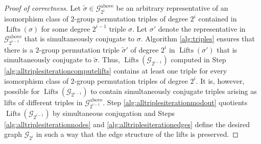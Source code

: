 \documentclass{dcthesis}
\newcommand{\wt}[1]{\widetilde{#1}}
\DeclareMathOperator{\Lifts}{Lifts}
\numberwithin{equation}{section}
\theoremstyle{definition}
\newtheorem{alg}[equation]{Algorithm}
\theoremstyle{remark}
\begin{document}
{{{\begin{proof}[Proof of correctness]
      Let
      $\wt{\sigma}\in\mathscr{G}_{2^i}^\text{above}$
      be an arbitrary representative
      of an isomorphism class of
      $2$-group permutation triples of degree $2^i$
      contained in $\Lifts(\sigma)$
      for some degree $2^{i-1}$ triple $\sigma$.
      Let $\sigma'$ denote the representative
      in $\mathscr{G}_{2^{i-1}}^\text{above}$
      that is simultaneously conjugate to
      $\sigma$.
      Algorithm \ref{alg:triples}
      ensures that there is a
      $2$-group permutation triple $\wt{\sigma}'$
      of degree $2^i$ in
      $\Lifts(\sigma')$
      that is simultaneously conjugate
      to $\wt{\sigma}$.
      Thus,
      $\Lifts(\mathscr{G}_{2^{i-1}})$
      computed in Step
      \ref{alg:alltriplesiterationcomputelifts}
      contains at least one 
      triple for every
      isomorphism class of $2$-group
      permutation triples of degree $2^i$.
      It is,
      however,
      possible for
      $\Lifts(\mathscr{G}_{2^{i-1}})$
      to contain simultaneously conjugate
      triples arising as lifts of
      different triples in
      $\mathscr{G}_{2^{i-1}}^\text{above}$.
      Step
      \ref{alg:alltriplesiterationmodout}
      quotients
      $\Lifts(\mathscr{G}_{2^{i-1}})$
      by simultaneous conjugation
      and
      Steps
      \ref{alg:alltriplesiterationnodes}
      and
      \ref{alg:alltriplesiterationedges}
      define the desired graph
      $\mathscr{G}_{2^i}$ in such a way
      that the edge structure of the lifts
      is preserved.
    \end{proof}
}}}
\end{document}
